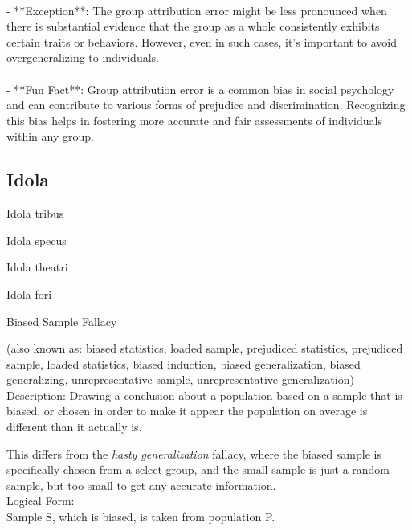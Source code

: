 \documentclass[a4paper,12pt,single,pdftex]{scrartcl}
\begin{document}
    
      
    \\

    
      - **Exception**: The group attribution error might be less pronounced when there is substantial evidence that the group as a whole consistently exhibits certain traits or behaviors. However, even in such cases, it’s important to avoid overgeneralizing to individuals.
    \\

    
      
    \\

    
      - **Fun Fact**: Group attribution error is a common bias in social psychology and can contribute to various forms of prejudice and discrimination. Recognizing this bias helps in fostering more accurate and fair assessments of individuals within any group.
    \\

  \subsection{Idola}


Idola tribus

Idola specus

Idola theatri

Idola fori

Biased Sample Fallacy
    
      (also known as: biased statistics, loaded sample, prejudiced statistics, prejudiced sample, loaded statistics, biased induction, biased generalization, biased generalizing, unrepresentative sample, unrepresentative generalization)
    \\

  
    Description: Drawing a conclusion about a population based on a sample that is biased, or chosen in order to make it appear the population on average is different than it actually is.

    
      This differs from the {\it hasty generalization} fallacy, where the biased sample is specifically chosen from a select group, and the small sample is just a random sample, but too small to get any accurate information.
    \\

    
      Logical Form:
    \\

    
      Sample S, which is biased, is taken from population P.
    \\
\end{document}
